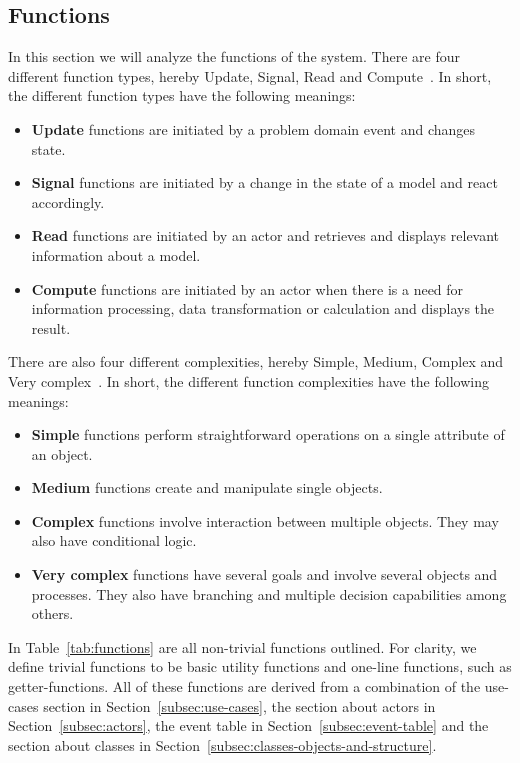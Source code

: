 \subsection{Functions}\label{subsec:functions}

In this section we will analyze the functions of the system.
There are four different function types, hereby Update, Signal, Read and Compute~\cite{mathiassen2018}.
In short, the different function types have the following meanings:

\begin{itemize}
    \item \textbf{Update} functions are initiated by a problem domain event and changes state.
    \item \textbf{Signal} functions are initiated by a change in the state of a model and react accordingly.
    \item \textbf{Read} functions are initiated by an actor and retrieves and displays relevant information about a
    model.
    \item \textbf{Compute} functions are initiated by an actor when there is a need for information processing, data
    transformation or calculation and displays the result.
\end{itemize}

There are also four different complexities, hereby Simple, Medium, Complex and Very complex~\cite{mathiassen2018}.
In short, the different function complexities have the following meanings:

\begin{itemize}
    \item \textbf{Simple} functions perform straightforward operations on a single attribute of an object.
    \item \textbf{Medium} functions create and manipulate single objects.
    \item \textbf{Complex} functions involve interaction between multiple objects.
    They may also have conditional logic.
    \item \textbf{Very complex} functions have several goals and involve several objects and processes.
    They also have branching and multiple decision capabilities among others.
\end{itemize}

In Table~\ref{tab:functions} are all non-trivial functions outlined.
For clarity, we define trivial functions to be basic utility functions and one-line functions, such as getter-functions.
All of these functions are derived from a combination of the use-cases section in Section~\ref{subsec:use-cases},
the section about actors in Section~\ref{subsec:actors}, the event table in Section~\ref{subsec:event-table} and the
section about classes in Section~\ref{subsec:classes-objects-and-structure}.

